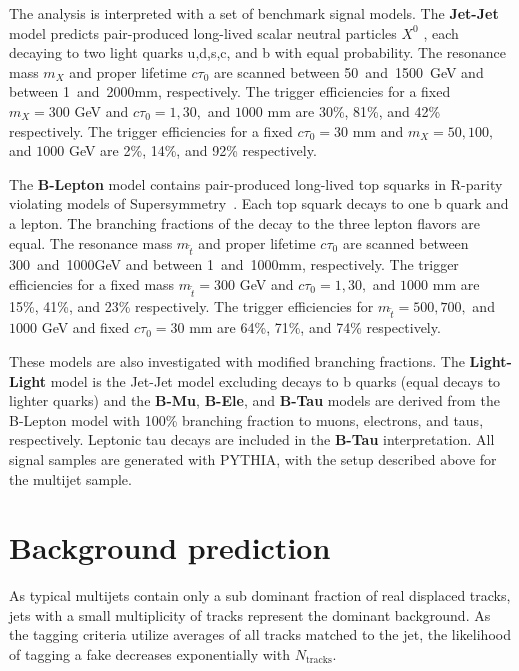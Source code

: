 The analysis is interpreted with a set of benchmark signal models.
The \textbf{Jet-Jet} model predicts pair-produced long-lived
scalar neutral particles $X^{0}$ \cite{ScalarX}, each decaying to two light quarks u,d,s,c, and b
with equal probability. The resonance
mass $m_X$ and proper lifetime $c\tau_0$ are scanned between
50~and~1500~GeV and between 1~and~2000mm, respectively. The
trigger efficiencies for a fixed  $m_X=300$ GeV and 
$c\tau_0 = 1, 30,$ and $1000$ mm are 30\%, 81\%, and 42\%  
 respectively. The trigger efficiencies for a fixed  $c\tau_0=30$
 mm and $m_{X} = 50, 100,$ and $1000$ GeV
 are 2\%, 14\%, and 92\%  respectively.

The \textbf{B-Lepton} model contains pair-produced long-lived top squarks
in R-parity violating models of Supersymmetry~\cite{DisplacedSUSY}. Each top squark decays
to one b quark and a lepton. The branching fractions of the
decay to the three lepton flavors are equal. The
resonance mass $m_{\tilde{t}}$ and proper lifetime $c\tau_0$ are
scanned between 300~and~1000GeV and between 1~and~1000mm,
respectively. The trigger efficiencies for a fixed mass 
$m_{\tilde{t}}=300$ GeV and $c\tau_0 = 1, 30,$ and $1000$ mm
 are 15\%, 41\%, and 23\%  respectively.
The trigger efficiencies for  $m_{\tilde{t}} = 500, 700,$ and $1000$ GeV and fixed  $c\tau_0=30$ mm are 64\%, 71\%, and 74\% respectively.

These models are also investigated with modified
branching fractions.  The \textbf{Light-Light} model is the Jet-Jet
model excluding decays to b quarks (equal decays to lighter quarks)
and the \textbf{B-Mu}, \textbf{B-Ele}, and \textbf{B-Tau} models are
derived from the B-Lepton model with 100\% branching fraction to
muons, electrons, and taus, respectively.  Leptonic tau decays are included 
in the \textbf{B-Tau} interpretation. All signal samples are
generated with PYTHIA, with the setup described above for the
multijet sample. 


\section{Background prediction}
\label{sec:bkg}

As typical multijets contain only a sub dominant fraction of real displaced tracks,
jets with a small multiplicity of tracks represent the dominant background.
As the tagging criteria utilize averages of all tracks matched to the jet, the likelihood of tagging a fake decreases exponentially with $N_\textrm{tracks}$. 

